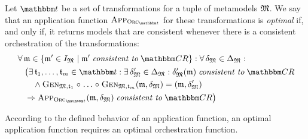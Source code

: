 \begin{definition}
    \label{def:optimalapplicationfunction}
    Let $\transformationset{T}$ be a set of transformations for a tuple of metamodels $\metamodeltuple{M} %
    $.
    We say that an application function $\appfunction{\orcfunction{\transformationset{T}}}$ for these transformations is \emph{optimal} if, and only if, it returns models that are consistent whenever there is a consistent orchestration of the transformations:
    \begin{align*}
        &
        \forall \modeltuple{m} \in \setted{\modeltuple{m}' \in \metamodeltupleinstanceset{M} \mid \modeltuple{m}' \consistenttomath \consistencyrelationset{CR}} : \forall \changetuple{\metamodeltuple{M}} %
        \in \changeuniverse{\metamodeltuple{M}} : \\
        & \formulaskip
        \bigl(
            \exists \transformation{t}_{1}, \dots, \transformation{t}_{m} \in \transformationset{T} : 
            \exists \changetuple{\metamodeltuple{M}}' %
            \in \changeuniverse{\metamodeltuple{M}} : \changetuple{\metamodeltuple{M}}'(\modeltuple{m}) \consistenttomath \consistencyrelationset{CR}\\
            & \formulaskip \formulaskip
            \land \generalizationfunction{\metamodeltuple{M}, \transformation{t}_{1}} \concatfunction \dots \concatfunction \generalizationfunction{\metamodeltuple{M}, \transformation{t}_{m}}(\modeltuple{m}, \changetuple{\metamodeltuple{M}}) = (\modeltuple{m}, \changetuple{\metamodeltuple{M}}') %
            \\
            & \formulaskip
            \Rightarrow \appfunction{\orcfunction{\transformationset{T}}}(\modeltuple{m},\changetuple{\metamodeltuple{M}}) \consistenttomath \consistencyrelationset{CR}
        \bigr)
    \end{align*}
\end{definition}

According to the defined behavior of an application function, an optimal application function requires an optimal orchestration function.

